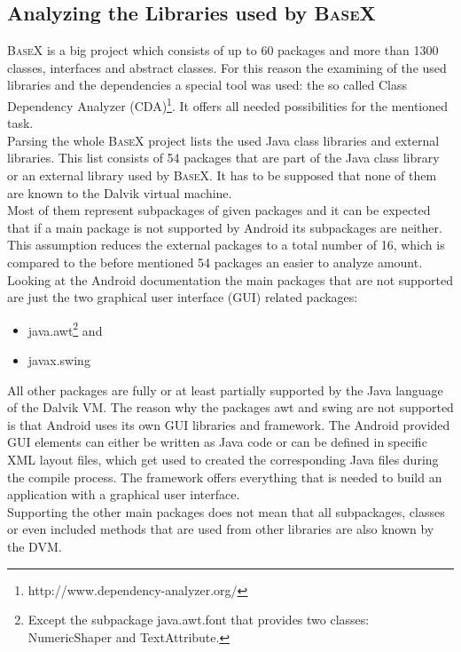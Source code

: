 \subsection{Analyzing the Libraries used by \textsc{BaseX}}
\label{sec:migration:analyzing-the-libraries-used-by-basex}
\textsc{BaseX} is a big project which consists of up to 60 packages and more than 1300 classes, interfaces and abstract classes.
For this reason the examining of the used libraries and the dependencies a special tool was used: the so called Class Dependency Analyzer (CDA)\footnote{http://www.dependency-analyzer.org/}. 
It offers all needed possibilities for the mentioned task.\\
Parsing the whole \textsc{BaseX} project lists the used Java class libraries and external libraries.
This list consists of 54 packages that are part of the Java class library or an external library used by \textsc{BaseX}.
It has to be supposed that none of them are known to the Dalvik virtual machine.\\
Most of them represent subpackages of given packages and it can be expected that if a main package is not supported by Android its subpackages are neither.
This assumption reduces the external packages to a total number of 16, which is compared to the before mentioned 54 packages an easier to analyze amount.
Looking at the Android documentation the main packages that are not supported are just the two graphical user interface (GUI) related packages:
\begin{itemize}
	\item \textsf{java.awt}\footnote{Except the subpackage java.awt.font that provides two classes: NumericShaper and TextAttribute.} and
	\item \textsf{javax.swing}
\end{itemize}
All other packages are fully or at least partially supported by the Java language of the Dalvik VM.
The reason why the packages \textsf{awt} and \textsf{swing} are not supported is that Android uses its own GUI libraries and framework.
The Android provided GUI elements can either be written as Java code or can be defined in specific XML layout files, which get used to created the corresponding Java files during the compile process.
The framework offers everything that is needed to build an application with a graphical user interface.\\
Supporting the other main packages does not mean that all subpackages, classes or even included methods that are used from other libraries are also known by the DVM.

